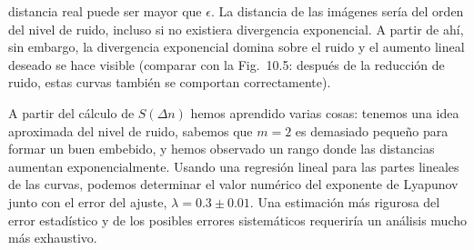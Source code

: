 \documentclass[10pt,a4paper]{book}
\begin{document}
distancia real puede ser mayor que $\epsilon$. La distancia de las imágenes sería del orden del nivel de ruido, incluso si no existiera divergencia exponencial. A partir de ahí, sin embargo, la divergencia exponencial domina sobre el ruido y el aumento lineal deseado se hace visible (comparar con la Fig.~10.5: después de la reducción de ruido, estas curvas también se comportan correctamente). 

\bigskip

A partir del cálculo de \( S(\Delta n) \) hemos aprendido varias cosas: tenemos una idea aproximada del nivel de ruido, sabemos que \( m = 2 \) es demasiado pequeño para formar un buen embebido, y hemos observado un rango donde las distancias aumentan exponencialmente. Usando una regresión lineal para las partes lineales de las curvas, podemos determinar el valor numérico del exponente de Lyapunov junto con el error del ajuste, \( \lambda = 0.3 \pm 0.01 \). Una estimación más rigurosa del error estadístico y de los posibles errores sistemáticos requeriría un análisis mucho más exhaustivo.

\newpage
\end{document}
